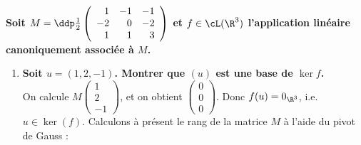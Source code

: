 \documentclass[a4paper, 11pt,reqno]{article}
\begin{document}
\begin{correction}  \;
	\textbf{Soit $M=\ddp\frac{1}{2}\left(\begin{array}{rrr} 1&-1&-1\\-2&0&-2\\1&1&3 \end{array}\right)$ et $f\in\cL(\R^3)$ l'application lin\'eaire canoniquement associ\'ee \`a $M$.}
	\begin{enumerate}
		\item \textbf{Soit $u=(1,2,-1)$. Montrer que $(u)$ est une base de $\ker f$.}\\
		      On calcule $M \left(\begin{array}{r} 1 \\ 2 \\ -1 \end{array}\right)$, et on obtient $\left(\begin{array}{r} 0 \\ 0 \\ 0\end{array}\right)$. Donc $f(u)=0_{\R^3}$, i.e. $u \in \ker(f)$. Calculons \`a pr\'esent le rang de la matrice $M$ \`a l'aide du pivot de Gauss :

\end{enumerate}
\end{correction}
\end{document}
